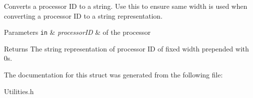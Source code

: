 Converts a processor I\-D to a string. Use this to ensure same width is used when converting a processor I\-D to a string representation. 


\begin{DoxyParams}[1]{Parameters}
\mbox{\tt in}  & {\em processor\-I\-D} & of the processor\\
\hline
\end{DoxyParams}
\begin{DoxyReturn}{Returns}
The string representation of processor I\-D of fixed width prepended with 0s. 
\end{DoxyReturn}


The documentation for this struct was generated from the following file\-:\begin{DoxyCompactItemize}
\item 
Utilities.\-h\end{DoxyCompactItemize}
